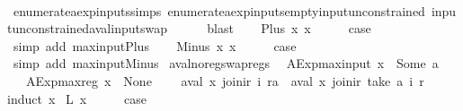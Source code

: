 \begin{isabellebody}
\ \ \ \ \isamarkupfalse%
\ enumerate{\isacharunderscore}aexp{\isacharunderscore}inputs{\isachardot}simps{\isacharparenleft}{}{\isacharparenright}\ enumerate{\isacharunderscore}aexp{\isacharunderscore}inputs{\isacharunderscore}empty{\isacharunderscore}input{\isacharunderscore}unconstrained\ input{\isacharunderscore}unconstrained{\isacharunderscore}aval{\isacharunderscore}input{\isacharunderscore}swap\isanewline
\ \ \ \ \isamarkupfalse%
\ blast\isanewline
{}\isamarkupfalse%
\isanewline
\ \ \isamarkupfalse%
\ {\isacharparenleft}Plus\ x{}\ x{}{\isacharparenright}\isanewline
\ \ \isamarkupfalse%
\ \isamarkupfalse%
\ {\isacharquery}case\isanewline
\ \ \ \ \isamarkupfalse%
\ {\isacharparenleft}simp\ add{\isacharcolon}\ max{\isacharunderscore}input{\isacharunderscore}Plus{\isacharparenright}\isanewline
{}\isamarkupfalse%
\isanewline
\ \ \isamarkupfalse%
\ {\isacharparenleft}Minus\ x{}\ x{}{\isacharparenright}\isanewline
\ \ \isamarkupfalse%
\ \isamarkupfalse%
\ {\isacharquery}case\isanewline
\ \ \ \ \isamarkupfalse%
\ {\isacharparenleft}simp\ add{\isacharcolon}\ max{\isacharunderscore}input{\isacharunderscore}Minus{\isacharparenright}\isanewline
{}\isamarkupfalse%
%
\endisatagproof
{\isafoldproof}%
%
\isadelimproof
\isanewline
%
\endisadelimproof
\isanewline
{}\isamarkupfalse%
\ aval{\isacharunderscore}no{\isacharunderscore}reg{\isacharunderscore}swap{\isacharunderscore}regs{\isacharcolon}\isanewline
\ \ {\isachardoublequoteopen}AExp{\isachardot}max{\isacharunderscore}input\ x\ {\isacharless}\ Some\ a\ {\isasymLongrightarrow}\isanewline
\ \ \ AExp{\isachardot}max{\isacharunderscore}reg\ x\ {\isacharequal}\ None\ {\isasymLongrightarrow}\isanewline
\ \ \ aval\ x\ {\isacharparenleft}join{\isacharunderscore}ir\ i\ ra{\isacharparenright}\ {\isacharequal}\ aval\ x\ {\isacharparenleft}join{\isacharunderscore}ir\ {\isacharparenleft}take\ a\ i{\isacharparenright}\ r{\isacharparenright}{\isachardoublequoteclose}\isanewline
%
\isadelimproof
%
\endisadelimproof
%
\isatagproof
{}\isamarkupfalse%
{\isacharparenleft}induct\ x{\isacharparenright}\isanewline
{}\isamarkupfalse%
\ {\isacharparenleft}L\ x{\isacharparenright}\isanewline
\ \ \isamarkupfalse%
\ \isamarkupfalse%
\ {\isacharquery}case\isanewline
\ \ \ \ \isamarkupfalse%

\end{isabellebody}
